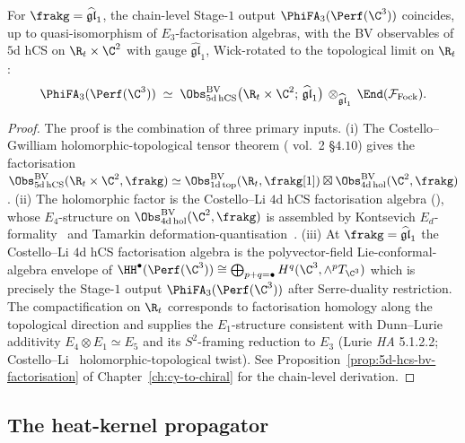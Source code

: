 \begin{proposition}[Stage-\texorpdfstring{$1$}{1} realisation at \texorpdfstring{$\frakg = \widehat{\mathfrak{gl}}_1$}{g = affine-gl1}]
\label{prop:phiutp-stage1-5d-hcs-gl1}
For $\frakg = \widehat{\mathfrak{gl}}_1$, the chain-level Stage-$1$
output $\PhiFA_3(\Perf(\C^3))$ coincides, up to quasi-isomorphism of
$E_3$-factorisation algebras, with the BV observables of $5$d hCS on
$\R_t\times\C^2$ with gauge $\widehat{\mathfrak{gl}}_1$, Wick-rotated
to the topological limit on $\R_t$:
\[
 \PhiFA_3(\Perf(\C^3))
 \;\simeq\;
 \Obs^{\mathrm{BV}}_{5\mathrm{d\,hCS}}\bigl(\R_t\times\C^2;\,
 \widehat{\mathfrak{gl}}_1\bigr)\,
 \otimes_{\widehat{\mathfrak{gl}}_1}\,
 \End(\mathcal{F}_{\mathrm{Fock}}).
\]
\end{proposition}

\begin{proof}
The proof is the combination of three primary inputs. \textup{(i)} The
Costello--Gwilliam holomorphic-topological tensor theorem
\textup{(}\cite{CostelloGwilliam} vol.~2 \S$4.10$\textup{)} gives the
factorisation
$\Obs^{\mathrm{BV}}_{5\mathrm{d\,hCS}}(\R_t\times\C^2,\frakg)
\simeq \Obs^{\mathrm{BV}}_{1\mathrm{d\,top}}(\R_t,\frakg[1])\boxtimes
\Obs^{\mathrm{BV}}_{4\mathrm{d\,hol}}(\C^2,\frakg)$. \textup{(ii)}
The holomorphic factor is the Costello--Li $4$d hCS factorisation
algebra \textup{(}\cite{CostelloLi2020}\textup{),} whose
$E_4$-structure on $\Obs^{\mathrm{BV}}_{4\mathrm{d\,hol}}(\C^2,\frakg)$
is assembled by Kontsevich $E_d$-formality~\cite{Kontsevich1999}
and Tamarkin deformation-quantisation~\cite{Tamarkin2007}. \textup{(iii)}
At $\frakg = \widehat{\mathfrak{gl}}_1$ the Costello--Li $4$d hCS
factorisation algebra is the polyvector-field
Lie-conformal-algebra envelope of $\HH^\bullet(\Perf(\C^3))
\cong \bigoplus_{p+q = \bullet}H^q(\C^3, \wedge^p T_{\C^3})$ which is
precisely the Stage-$1$ output $\PhiFA_3(\Perf(\C^3))$ after
Serre-duality restriction. The compactification on
$\R_t$ corresponds to factorisation homology along the topological
direction and supplies the $E_1$-structure consistent with
Dunn--Lurie additivity $E_4\otimes E_1 \simeq E_5$ and its
$S^2$-framing reduction to $E_3$
\textup{(}Lurie \emph{HA} 5.1.2.2; Costello--Li~\cite{CostelloLi2020}
holomorphic-topological twist\textup{).} See
Proposition~\ref{prop:5d-hcs-bv-factorisation} of
Chapter~\ref{ch:cy-to-chiral} for the chain-level derivation.
\end{proof}

\subsection{The heat-kernel propagator}
\label{subsec:phiutp-5d-hcs-propagator}

